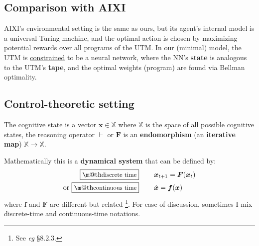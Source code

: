 \documentclass[orivec]{llncs}
\makeatletter
\newcommand{\emp}[1]{\textbf{#1}}
\newcommand{\vect}[1]{\boldsymbol{#1}}
\renewcommand{\boxed}[1]{\fbox{\m@th$\displaystyle\scalebox{0.9}{#1}$} \,}
\makeatother
\begin{document}

\subsection{Comparison with AIXI \cite{Wikipedia-AIXI}}

AIXI's environmental setting is the same as ours, but its agent's internal model is a universal Turing machine, and the optimal action is chosen by maximizing potential rewards over all programs of the UTM.  In our (minimal) model, the UTM is \uline{constrained} to be a neural network, where the NN's \textbf{state} is analogous to the UTM's \textbf{tape}, and the optimal weights (program) are found via Bellman optimality.

\subsection{Control-theoretic setting}
\label{sec:control-theory}

The cognitive state is a vector $\vect{x} \in \mathbb{X}$ where $\mathbb{X}$ is the space of all possible cognitive states, the reasoning operator $\vdash$ or $\vect{F}$ is an \textbf{endomorphism} (an \textbf{iterative map}) $\mathbb{X} \rightarrow \mathbb{X}$.

Mathematically this is a \emp{dynamical system} that can be defined by:
\begin{eqnarray}
\boxed{\mbox{discrete time}} \quad \quad & \vect{x}_{t+1} = \vect{F}(\vect{x}_t) \label{eqn0}\\
\mbox{or } \boxed{\mbox{continuous time}} \quad \quad & \dot{\vect{x}} = \vect{f}(\vect{x}) \label{eqn1}
\end{eqnarray}
where $\vect{f}$ and $\vect{F}$ are different but related
\footnote{
	See \textit{eg} \cite{Dolotin2007} \S8.2.3.
}.
For ease of discussion, sometimes I mix discrete-time and continuous-time notations.
\end{document}
